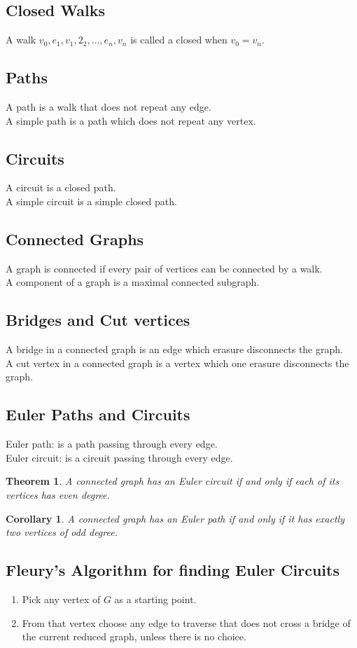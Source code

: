 \documentclass{article}
\newtheorem{thm}{Theorem}
\newtheorem{corollary}{Corollary}
\begin{document}
\begin{spacing}{1.5}
\subsection{Closed Walks}
A walk $v_0,e_1,v_1,2_2,\dots,e_n,v_n$ is called a closed when $v_0 = v_n$. 
\subsection{Paths}
A path is a walk that does not repeat any edge.\\
A simple path is a path which does not repeat any vertex.
\subsection{Circuits}
A circuit is a closed path.\\
A simple circuit is a simple closed path.
\subsection{Connected Graphs}
A graph is connected if every pair of vertices can be connected by a walk.\\
A component of a graph is a maximal connected subgraph.
\subsection{Bridges and Cut vertices}
A bridge in a connected graph is an edge which erasure disconnects the graph. \\
A cut vertex in a connected graph is a vertex which one erasure disconnects the graph. 
\subsection{Euler Paths and Circuits}
Euler path: is a path passing through every edge.\\ 
Euler circuit: is a circuit passing through every edge.
\begin{thm}
    A connected graph has an Euler circuit if and only if each of its vertices has even degree. 
\end{thm}
\begin{corollary}
    A connected graph has an Euler path if and only if it has exactly two vertices of odd degree. 
\end{corollary}
\subsection{Fleury's Algorithm for finding Euler Circuits}
\begin{enumerate}
    \item Pick any vertex of $G$ as a starting point. 
    \item From that vertex choose any edge to traverse that does not cross a bridge of the current reduced graph, unless there is no choice.
\end{enumerate}

\end{spacing}
\end{document}
